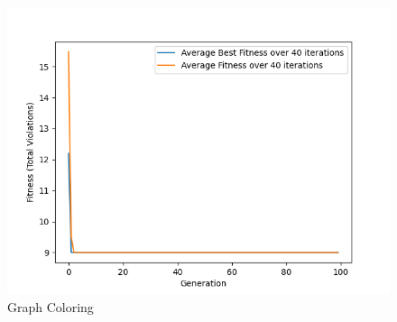 \documentclass[11pt, letterpaper]{article}
\begin{document}
\begin{figure}[H]
  \includegraphics[width=\linewidth]{images/graphcoloring_fp_tr.png}
  \caption{Graph Coloring}
\endminipage
\end{figure}
\end{document}
